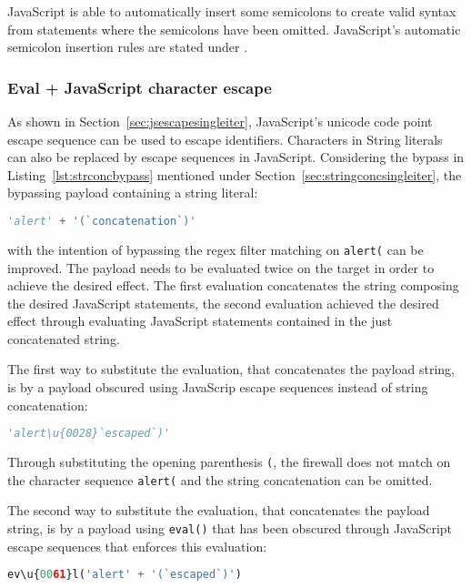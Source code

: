 JavaScript is able to automatically insert some semicolons to create valid syntax from statements where the semicolons have been omitted. JavaScript's automatic semicolon insertion rules are stated under \cite{js/autosemi}.


\subsubsection{Eval + JavaScript character escape}
\label{sec:jsescapemultiiter}
As shown in Section~\ref{sec:jsescapesingleiter}, JavaScript's unicode code point escape sequence can be used to escape identifiers.
Characters in String literals can also be replaced by escape sequences in JavaScript. Considering the bypass in Listing~\ref{lst:strconcbypass} mentioned under Section~\ref{sec:stringconcsingleiter}, the bypassing payload containing a string literal:

\begin{lstlisting}[style=basicStyle, language=Python]
'alert' + '(`concatenation`)'
\end{lstlisting}

with the intention of bypassing the regex filter matching on \verb|alert(| can be improved. The payload needs to be evaluated twice on the target in order to achieve the desired effect. The first evaluation concatenates the string composing the desired JavaScript statements, the second evaluation achieved the desired effect through evaluating JavaScript statements contained in the just concatenated string. 

The first way to substitute the evaluation, that concatenates the payload string, is by a payload obscured using JavaScrip escape sequences instead of string concatenation:

\begin{lstlisting}[style=basicStyle, language=Python, caption='alert\textbackslash u\{0028\}`escaped`) bypass]
'alert\u{0028}`escaped`)'
\end{lstlisting}

Through substituting the opening parenthesis \verb|(|, the firewall does not match on the character sequence \verb|alert(| and the string concatenation can be omitted.

The second way to substitute the evaluation, that concatenates the payload string, is by a payload using \verb|eval()| that has been obscured through JavaScript escape sequences that enforces this evaluation:

\begin{lstlisting}[style=basicStyle, language=Python, caption='ev\textbackslash u\{0061\}l('alert' + '(`escaped`)') bypass]
ev\u{0061}l('alert' + '(`escaped`)')
\end{lstlisting}

